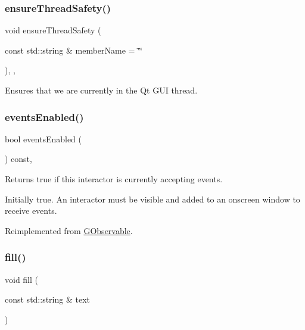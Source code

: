 \subsubsection{\texorpdfstring{ensure\+Thread\+Safety()}{ensureThreadSafety()}}
{\footnotesize\ttfamily void ensure\+Thread\+Safety (\begin{DoxyParamCaption}\item[{const std\+::string \&}]{member\+Name = {\ttfamily \char`\"{}\char`\"{}} }\end{DoxyParamCaption})\hspace{0.3cm}{\ttfamily [protected]}, {\ttfamily [virtual]}, {\ttfamily [inherited]}}



Ensures that we are currently in the Qt G\+UI thread. 

\mbox{\label{classGInteractor_ac05ba5b92e2e5146d416fe7f842a0969}} 
\subsubsection{\texorpdfstring{events\+Enabled()}{eventsEnabled()}}
{\footnotesize\ttfamily bool events\+Enabled (\begin{DoxyParamCaption}{ }\end{DoxyParamCaption}) const\hspace{0.3cm}{\ttfamily [virtual]}, {\ttfamily [inherited]}}



Returns true if this interactor is currently accepting events. 

Initially true. An interactor must be visible and added to an onscreen window to receive events. 

Reimplemented from \mbox{\hyperlink{classGObservable_a8ebb3da91032e7f4c34485dabc518b8a}{G\+Observable}}.

\mbox{\label{classGTable_a1ff40d0915f96652929cfb739bdd969f}} 
\subsubsection{\texorpdfstring{fill()}{fill()}}
{\footnotesize\ttfamily void fill (\begin{DoxyParamCaption}\item[{const std\+::string \&}]{text }\end{DoxyParamCaption})\hspace{0.3cm}{\ttfamily [virtual]}}



